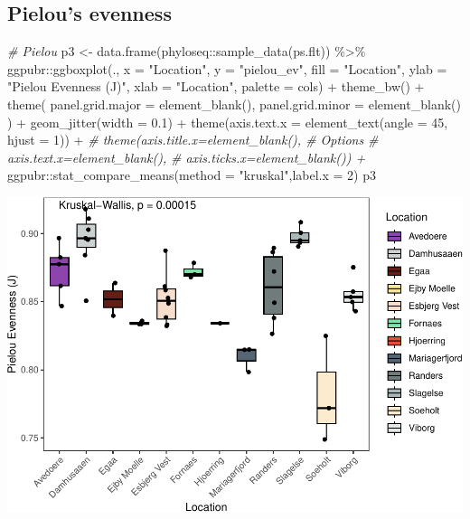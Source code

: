 \documentclass[
]{book}
\newenvironment{Shaded}{\begin{snugshade}}{\end{snugshade}}
\newcommand{\AttributeTok}[1]{\textcolor[rgb]{0.77,0.63,0.00}{#1}}
\newcommand{\CommentTok}[1]{\textcolor[rgb]{0.56,0.35,0.01}{\textit{#1}}}
\newcommand{\DecValTok}[1]{\textcolor[rgb]{0.00,0.00,0.81}{#1}}
\newcommand{\FloatTok}[1]{\textcolor[rgb]{0.00,0.00,0.81}{#1}}
\newcommand{\FunctionTok}[1]{\textcolor[rgb]{0.00,0.00,0.00}{#1}}
\newcommand{\NormalTok}[1]{#1}
\newcommand{\OtherTok}[1]{\textcolor[rgb]{0.56,0.35,0.01}{#1}}
\newcommand{\SpecialCharTok}[1]{\textcolor[rgb]{0.00,0.00,0.00}{#1}}
\newcommand{\StringTok}[1]{\textcolor[rgb]{0.31,0.60,0.02}{#1}}
\begin{document}
\hypertarget{pielous-evenness}{%
\subsection{Pielou's evenness}\label{pielous-evenness}}

\begin{Shaded}
\begin{Highlighting}[]
\CommentTok{\# Pielou}
\NormalTok{p3 }\OtherTok{\textless{}{-}} \FunctionTok{data.frame}\NormalTok{(phyloseq}\SpecialCharTok{::}\FunctionTok{sample\_data}\NormalTok{(ps.flt)) }\SpecialCharTok{\%\textgreater{}\%}
\NormalTok{  ggpubr}\SpecialCharTok{::}\FunctionTok{ggboxplot}\NormalTok{(., }\AttributeTok{x =} \StringTok{"Location"}\NormalTok{, }
                    \AttributeTok{y =} \StringTok{"pielou\_ev"}\NormalTok{, }
                    \AttributeTok{fill =} \StringTok{"Location"}\NormalTok{, }
                    \AttributeTok{ylab =} \StringTok{"Pielou Evenness (J)"}\NormalTok{, }
                    \AttributeTok{xlab =} \StringTok{"Location"}\NormalTok{, }
                    \AttributeTok{palette =}\NormalTok{ cols) }\SpecialCharTok{+}
    \FunctionTok{theme\_bw}\NormalTok{() }\SpecialCharTok{+}
    \FunctionTok{theme}\NormalTok{( }\AttributeTok{panel.grid.major =} \FunctionTok{element\_blank}\NormalTok{(), }\AttributeTok{panel.grid.minor =} \FunctionTok{element\_blank}\NormalTok{() ) }\SpecialCharTok{+}
    \FunctionTok{geom\_jitter}\NormalTok{(}\AttributeTok{width =} \FloatTok{0.1}\NormalTok{) }\SpecialCharTok{+}
   \FunctionTok{theme}\NormalTok{(}\AttributeTok{axis.text.x =} \FunctionTok{element\_text}\NormalTok{(}\AttributeTok{angle =} \DecValTok{45}\NormalTok{, }\AttributeTok{hjust =} \DecValTok{1}\NormalTok{)) }\SpecialCharTok{+} 
\CommentTok{\#    theme(axis.title.x=element\_blank(),  \# Options}
\CommentTok{\#        axis.text.x=element\_blank(),}
\CommentTok{\#        axis.ticks.x=element\_blank()) +}
\NormalTok{  ggpubr}\SpecialCharTok{::}\FunctionTok{stat\_compare\_means}\NormalTok{(}\AttributeTok{method =} \StringTok{"kruskal"}\NormalTok{,}\AttributeTok{label.x =} \DecValTok{2}\NormalTok{)}
\NormalTok{p3}
\end{Highlighting}
\end{Shaded}

\includegraphics{gitbook-demo_files/figure-latex/pielou-1.pdf}
\end{document}
